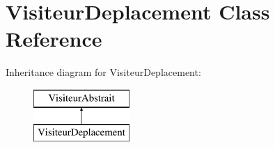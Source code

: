 \hypertarget{class_visiteur_deplacement}{}\section{Visiteur\+Deplacement Class Reference}
\label{class_visiteur_deplacement}
Inheritance diagram for Visiteur\+Deplacement\+:\begin{figure}[H]
\begin{center}
\leavevmode
\includegraphics[height=2.000000cm]{class_visiteur_deplacement}
\end{center}
\end{figure}
